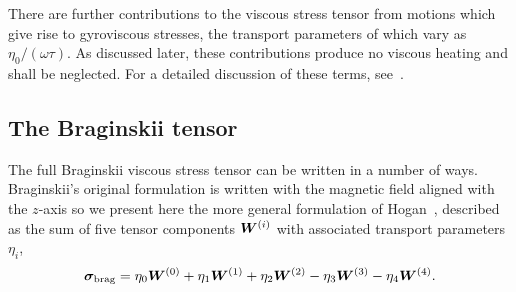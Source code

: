 There are further contributions to the viscous stress tensor from motions which give rise to gyroviscous stresses, the transport parameters of which vary as $\eta_0 / (\omega \tau)$. As discussed later, these contributions produce no viscous heating and shall be neglected. For a detailed discussion of these terms, see~\cite{kaufmanPlasmaViscosityMagnetic1960}.

\subsection{The Braginskii tensor}

\label{sec:braginskii_tensor}

The full Braginskii viscous stress tensor can be written in a number of ways. Braginskii's original formulation is written with the magnetic field aligned with the $z$-axis so we present here the more general formulation of Hogan~\cite{hoganCollisionalTransportMomentum1984}, described as the sum of five tensor components ${\bm W}^{(i)}$ with associated transport parameters $\eta_i$,
\begin{equation}
\label{eq:braginskii_tensor}
{\bm \sigma}_{\text{brag}} = \eta_0 {\bm W}^{(0)} + \eta_1 {\bm W}^{(1)} + \eta_2 {\bm W}^{(2)} - \eta_3 {\bm W}^{(3)} - \eta_4 {\bm W}^{(4)}.
\end{equation}

